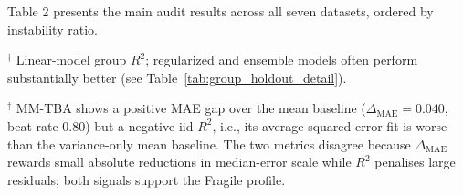 Table 2 presents the main audit results across all seven datasets, ordered by instability ratio.

\begin{table}[htbp]
\centering
\caption{Seven-dataset audit comparison. $I_{\mathrm{lin}}$ and $I_{\mathrm{gbt}}$ are instability ratios for linear and Gradient Boosting models. Beat rate is the fraction of 100 splits where the linear model outperforms the mean baseline. Perm\% is the fraction of tested splits with permutation $p < 0.05$. Group $R^2$ is the mean leave-one-group-out $R^2$ for the linear model; iid $R^2$ is the mean $R^2$ under random splitting.}
\label{tab:seven_dataset_audit}
%
\par\vspace{4pt}
\begin{flushleft}\footnotesize
$^{\dagger}$ Linear-model group $R^2$; regularized and ensemble models often perform substantially better (see Table~\ref{tab:group_holdout_detail}).\par
$^{\ddag}$ MM-TBA shows a positive MAE gap over the mean baseline ($\Delta_{\mathrm{MAE}} = 0.040$, beat rate $0.80$) but a negative iid $R^2$, i.e., its average squared-error fit is worse than the variance-only mean baseline. The two metrics disagree because $\Delta_{\mathrm{MAE}}$ rewards small absolute reductions in median-error scale while $R^2$ penalises large residuals; both signals support the Fragile profile.\par

\end{flushleft}
\end{table}
